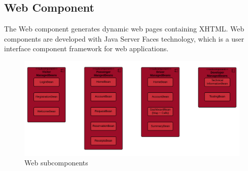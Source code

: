 \subsection{Web Component}
The Web component generates dynamic web pages containing XHTML.
Web components are developed with Java Server Faces technology, which is a user
interface component framework for web applications.

\begin{figure}[htbp]
\centering
\includegraphics[width=\textwidth]{cpt/img/WebInterfaces}
\caption{Web subcomponents}
\end{figure}
\clearpage

